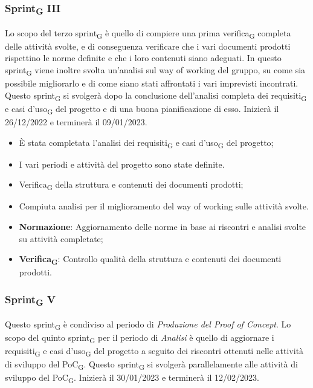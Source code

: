 \subsubsection{Sprint\textsubscript{G} III}
Lo scopo del terzo sprint\textsubscript{G} è quello di compiere una prima verifica\textsubscript{G} completa delle attività svolte, e di conseguenza verificare che i vari documenti prodotti rispettino le norme definite e che i loro contenuti siano adeguati. In questo sprint\textsubscript{G} viene inoltre svolta un'analisi sul way of working del gruppo, su come sia possibile migliorarlo e di come siano stati affrontati i vari imprevisti incontrati.
Questo sprint\textsubscript{G} si svolgerà dopo la conclusione dell'analisi completa dei requisiti\textsubscript{G} e casi d'uso\textsubscript{G} del progetto e di una buona pianificazione di esso. Inizierà il 26/12/2022 e terminerà il 09/01/2023.

\:
\begin{itemize}
	\item È stata completata l'analisi dei requisiti\textsubscript{G} e casi d'uso\textsubscript{G} del progetto;
	\item I vari periodi e attività del progetto sono state definite.
\end{itemize}

\:
\begin{itemize}
	\item Verifica\textsubscript{G} della struttura e contenuti dei documenti prodotti;
	\item Compiuta analisi per il miglioramento del way of working sulle attività svolte.
\end{itemize}

\:
\begin{itemize}
	\item \textbf{Normazione}: Aggiornamento delle norme in base ai riscontri e analisi svolte su attività completate;
	\item \textbf{Verifica\textsubscript{G}}: Controllo qualità della struttura e contenuti dei documenti prodotti.
\end{itemize}

\subsubsection{Sprint\textsubscript{G} V}
Questo sprint\textsubscript{G} è condiviso al periodo di \textit{Produzione del Proof of Concept}.
Lo scopo del quinto sprint\textsubscript{G} per il periodo di \textit{Analisi} è quello di aggiornare i requisiti\textsubscript{G} e casi d'uso\textsubscript{G} del progetto a seguito dei riscontri ottenuti nelle attività di sviluppo del PoC\textsubscript{G}.
Questo sprint\textsubscript{G} si svolgerà parallelamente alle attività di sviluppo del PoC\textsubscript{G}. Inizierà il 30/01/2023 e terminerà il 12/02/2023.

